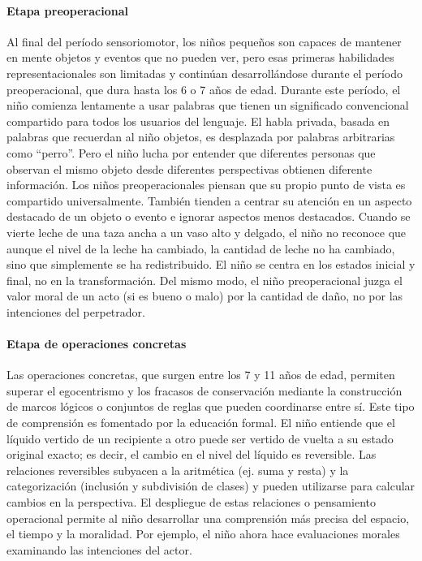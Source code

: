 \documentclass[11pt,letterpaper]{report}
\begin{document}
\paragraph{Etapa preoperacional}
Al final del período sensoriomotor, los niños pequeños son capaces de mantener
en mente objetos y eventos que no pueden ver, pero esas primeras habilidades
representacionales son limitadas y continúan desarrollándose durante el período
preoperacional, que dura hasta los 6 o 7 años de edad. Durante este período, el
niño comienza lentamente a usar palabras que tienen un significado convencional
compartido para todos los usuarios del lenguaje. El habla privada, basada en
palabras que recuerdan al niño objetos, es desplazada por palabras arbitrarias
como ``perro''. Pero el niño lucha por entender que diferentes personas que
observan el mismo objeto desde diferentes perspectivas obtienen diferente
información.
Los niños preoperacionales piensan que su propio punto de vista es compartido
universalmente. También tienden a centrar su atención en un aspecto destacado
de un objeto o evento e ignorar aspectos menos destacados. Cuando se vierte
leche de una taza ancha a un vaso alto y delgado, el niño no reconoce que
aunque el nivel de la leche ha cambiado, la cantidad de leche no ha cambiado,
sino que simplemente se ha redistribuido. El niño se centra en los estados
inicial y final, no en la transformación. Del mismo modo, el niño
preoperacional juzga el valor moral de un acto (si es bueno o malo) por la
cantidad de daño, no por las intenciones del perpetrador. \cite{Feldman3}

\paragraph{Etapa de operaciones concretas}
Las operaciones concretas, que surgen entre los 7 y 11 años de edad, permiten
superar el egocentrismo y los fracasos de conservación mediante la construcción
de marcos lógicos o conjuntos de reglas que pueden coordinarse entre sí. Este
tipo de comprensión es fomentado por la educación formal. El niño entiende que
el líquido vertido de un recipiente a otro puede ser vertido de vuelta a su
estado original exacto; es decir, el cambio en el nivel del líquido es
reversible. Las relaciones reversibles subyacen a la aritmética (ej. suma y
resta) y la categorización (inclusión y subdivisión de clases) y pueden
utilizarse para calcular cambios en la perspectiva. El despliegue de estas
relaciones o pensamiento operacional permite al niño desarrollar una
comprensión más precisa del espacio, el tiempo y la moralidad. Por ejemplo, el
niño ahora hace evaluaciones morales examinando las intenciones del actor.
\cite{Feldman3}
\end{document}
